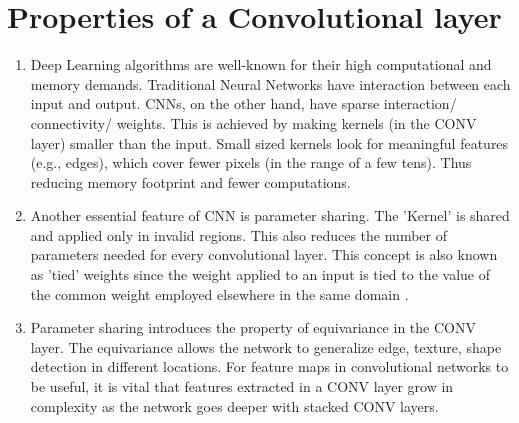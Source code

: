 \section{Properties of a Convolutional layer}\label{AppA:Props_CONV_layer}

\begin{enumerate}
\item Deep Learning algorithms are well-known for their high computational and memory demands. Traditional Neural Networks have interaction between each input and output. CNNs, on the other hand, have sparse interaction/ connectivity/ weights. This is achieved by making kernels (in the CONV layer) smaller than the input. Small sized kernels look for meaningful features (e.g., edges), which cover fewer pixels (in the range of a few tens). Thus reducing memory footprint and fewer computations.

\item Another essential feature of CNN is parameter sharing. The 'Kernel' is shared and applied only in invalid regions. This also reduces the number of parameters needed for every convolutional layer. This concept is also known as 'tied' weights since the weight applied to an input is tied to the value of the common weight employed elsewhere in the same domain \cite{goodfellow2016deep}. 

\item Parameter sharing introduces the property of equivariance in the CONV layer. The equivariance allows the network to generalize edge, texture, shape detection in different locations. For feature maps in convolutional networks to be useful, it is vital that features extracted in a CONV layer grow in complexity as the network goes deeper with stacked CONV layers. 

\end{enumerate}